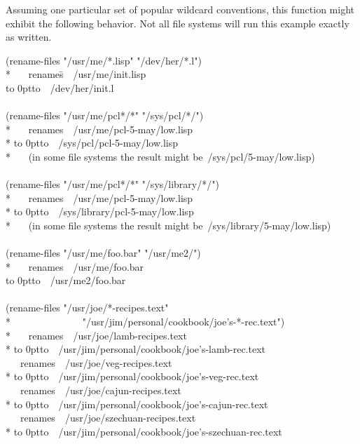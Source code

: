 \begin{newer}
Assuming one particular set of popular wildcard conventions,
this function might exhibit the following behavior.
Not all file systems will run this example exactly as written.
\begin{lisp}
(rename-files "/usr/me/*.lisp" "/dev/her/*.l") \\*
~~~{\rm renames}\=~~/usr/me/init.lisp \\
\>\hbox to 0pt{\hss\rm to}~~/dev/her/init.l \\
\\
(rename-files "/usr/me/pcl*/*" "/sys/pcl/*/") \\*
~~~{\rm renames}~~/usr/me/pcl-5-may/low.lisp \\*
\>\hbox to 0pt{\hss\rm to}~~/sys/pcl/pcl-5-may/low.lisp \\*
~~~{\rm (in some file systems the result might be}~/sys/pcl/5-may/low.lisp{\rm )} \\
\\
(rename-files "/usr/me/pcl*/*" "/sys/library/*/") \\*
~~~{\rm renames}~~/usr/me/pcl-5-may/low.lisp \\*
\>\hbox to 0pt{\hss\rm to}~~/sys/library/pcl-5-may/low.lisp \\*
~~~{\rm (in some file systems the result might be}~/sys/library/5-may/low.lisp{\rm )} \\
\\
(rename-files "/usr/me/foo.bar" "/usr/me2/") \\*
~~~{\rm renames}~~/usr/me/foo.bar \\
\>\hbox to 0pt{\hss\rm to}~~/usr/me2/foo.bar \\
\\
(rename-files "/usr/joe/*-recipes.text" \\*
~~~~~~~~~~~~~~"/usr/jim/personal/cookbook/joe's-*-rec.text") \\*
~~~{\rm renames}~~/usr/joe/lamb-recipes.text \\*
\>\hbox to 0pt{\hss\rm to}~~/usr/jim/personal/cookbook/joe's-lamb-rec.text~~~~ \\
~~~{\rm renames}~~/usr/joe/veg-recipes.text \\*
\>\hbox to 0pt{\hss\rm to}~~/usr/jim/personal/cookbook/joe's-veg-rec.text~~~~~ \\
~~~{\rm renames}~~/usr/joe/cajun-recipes.text \\*
\>\hbox to 0pt{\hss\rm to}~~/usr/jim/personal/cookbook/joe's-cajun-rec.text~~~ \\
~~~{\rm renames}~~/usr/joe/szechuan-recipes.text \\*
\>\hbox to 0pt{\hss\rm to}~~/usr/jim/personal/cookbook/joe's-szechuan-rec.text
\end{lisp}


\end{newer}
